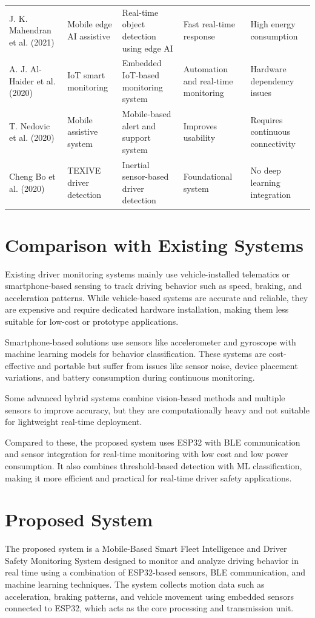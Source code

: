 \begin{table}[H]
\begin{tabularx}{\textwidth}{lp{3.5cm}p{3.5cm}p{2.5cm}p{2.5cm}}
\addlinespace
J. K. Mahendran et al. (2021) & Mobile edge AI assistive & Real-time object detection using edge AI & Fast real-time response & High energy consumption \\
\addlinespace
A. J. Al-Haider et al. (2020) & IoT smart monitoring & Embedded IoT-based monitoring system & Automation and real-time monitoring & Hardware dependency issues \\
\addlinespace
T. Nedovic et al. (2020) & Mobile assistive system & Mobile-based alert and support system & Improves usability & Requires continuous connectivity \\
\addlinespace
Cheng Bo et al. (2020) & TEXIVE driver detection & Inertial sensor-based driver detection & Foundational system & No deep learning integration \\
\bottomrule
\end{tabularx}
\end{table}

\section{Comparison with Existing Systems}
\label{sec:comp_existing}
Existing driver monitoring systems mainly use vehicle-installed telematics or smartphone-based sensing to track driving behavior such as speed, braking, and acceleration patterns. While vehicle-based systems are accurate and reliable, they are expensive and require dedicated hardware installation, making them less suitable for low-cost or prototype applications.

Smartphone-based solutions use sensors like accelerometer and gyroscope with machine learning models for behavior classification. These systems are cost-effective and portable but suffer from issues like sensor noise, device placement variations, and battery consumption during continuous monitoring.

Some advanced hybrid systems combine vision-based methods and multiple sensors to improve accuracy, but they are computationally heavy and not suitable for lightweight real-time deployment.

Compared to these, the proposed system uses ESP32 with BLE communication and sensor integration for real-time monitoring with low cost and low power consumption. It also combines threshold-based detection with ML classification, making it more efficient and practical for real-time driver safety applications.

\section{Proposed System}
\label{sec:proposed_system}
The proposed system is a Mobile-Based Smart Fleet Intelligence and Driver Safety Monitoring System designed to monitor and analyze driving behavior in real time using a combination of ESP32-based sensors, BLE communication, and machine learning techniques. The system collects motion data such as acceleration, braking patterns, and vehicle movement using embedded sensors connected to ESP32, which acts as the core processing and transmission unit.

